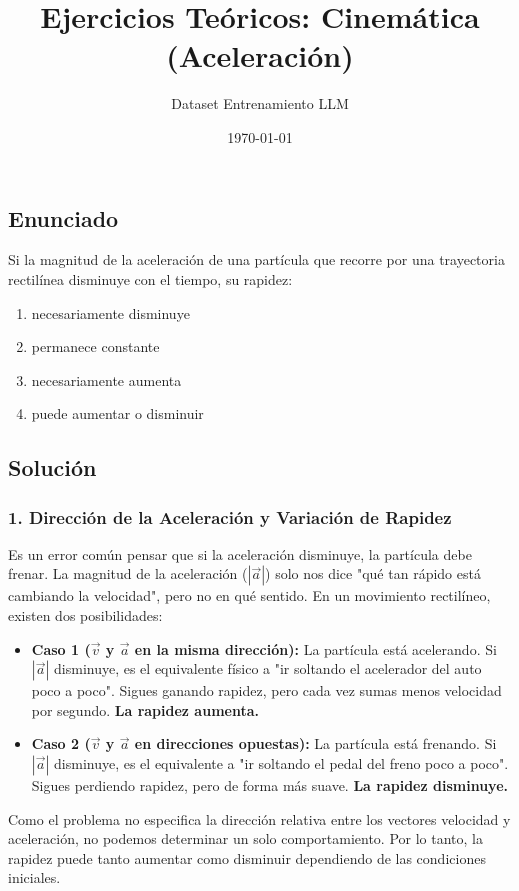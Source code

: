 \documentclass[12pt, a4paper]{article}
\title{Ejercicios Teóricos: Cinemática (Aceleración)}
\author{Dataset Entrenamiento LLM}
\date{\today}
\begin{document}
\maketitle

\subsection*{Enunciado}
Si la magnitud de la aceleración de una partícula que recorre por una trayectoria rectilínea disminuye con el tiempo, su rapidez:
\begin{enumerate}[label=\alph*)]
    \item necesariamente disminuye
    \item permanece constante
    \item necesariamente aumenta
    \item puede aumentar o disminuir
\end{enumerate}

\subsection*{Solución}

\subsubsection*{1. Dirección de la Aceleración y Variación de Rapidez}
Es un error común pensar que si la aceleración disminuye, la partícula debe frenar. La magnitud de la aceleración ($|\vec{a}|$) solo nos dice "qué tan rápido está cambiando la velocidad", pero no en qué sentido.
En un movimiento rectilíneo, existen dos posibilidades:
\begin{itemize}
    \item \textbf{Caso 1 ($\vec{v}$ y $\vec{a}$ en la misma dirección):} La partícula está acelerando. Si $|\vec{a}|$ disminuye, es el equivalente físico a "ir soltando el acelerador del auto poco a poco". Sigues ganando rapidez, pero cada vez sumas menos velocidad por segundo. \textbf{La rapidez aumenta.}
    \item \textbf{Caso 2 ($\vec{v}$ y $\vec{a}$ en direcciones opuestas):} La partícula está frenando. Si $|\vec{a}|$ disminuye, es el equivalente a "ir soltando el pedal del freno poco a poco". Sigues perdiendo rapidez, pero de forma más suave. \textbf{La rapidez disminuye.}
\end{itemize}

Como el problema no especifica la dirección relativa entre los vectores velocidad y aceleración, no podemos determinar un solo comportamiento. Por lo tanto, la rapidez puede tanto aumentar como disminuir dependiendo de las condiciones iniciales.
\end{document}
